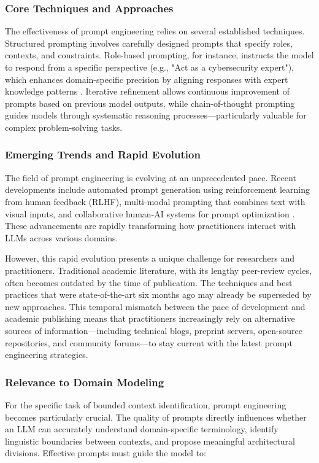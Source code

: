 \subsubsection{Core Techniques and Approaches}
The effectiveness of prompt engineering relies on several established techniques. Structured prompting involves carefully designed prompts that specify roles, contexts, and constraints. Role-based prompting, for instance, instructs the model to respond from a specific perspective (e.g., "Act as a cybersecurity expert"), which enhances domain-specific precision by aligning responses with expert knowledge patterns \autocite[]{promptAqsa}. Iterative refinement allows continuous improvement of prompts based on previous model outputs, while chain-of-thought prompting guides models through systematic reasoning processes—particularly valuable for complex problem-solving tasks.

\subsubsection{Emerging Trends and Rapid Evolution}
The field of prompt engineering is evolving at an unprecedented pace. Recent developments include automated prompt generation using reinforcement learning from human feedback (RLHF), multi-modal prompting that combines text with visual inputs, and collaborative human-AI systems for prompt optimization \autocite[]{promptAqsa}. These advancements are rapidly transforming how practitioners interact with LLMs across various domains.

However, this rapid evolution presents a unique challenge for researchers and practitioners. Traditional academic literature, with its lengthy peer-review cycles, often becomes outdated by the time of publication. The techniques and best practices that were state-of-the-art six months ago may already be superseded by new approaches. This temporal mismatch between the pace of development and academic publishing means that practitioners increasingly rely on alternative sources of information—including technical blogs, preprint servers, open-source repositories, and community forums—to stay current with the latest prompt engineering strategies.

\subsubsection{Relevance to Domain Modeling}
For the specific task of bounded context identification, prompt engineering becomes particularly crucial. The quality of prompts directly influences whether an LLM can accurately understand domain-specific terminology, identify linguistic boundaries between contexts, and propose meaningful architectural divisions. Effective prompts must guide the model to:

